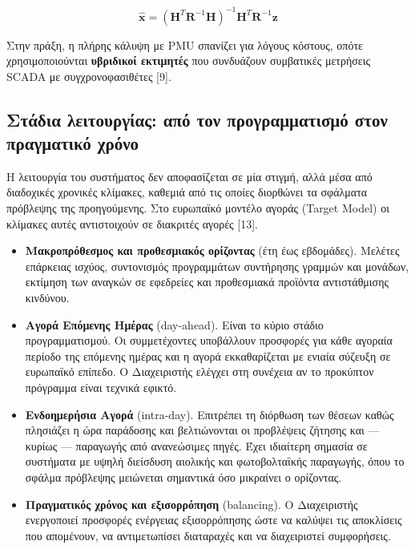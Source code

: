 \begin{equation}
\hat{\mathbf{x}} = \left(\mathbf{H}^{T}\mathbf{R}^{-1}\mathbf{H}\right)^{-1}
                    \mathbf{H}^{T}\mathbf{R}^{-1}\mathbf{z}
\label{eq:linse}
\end{equation}

Στην πράξη, η πλήρης κάλυψη με PMU σπανίζει για λόγους κόστους, οπότε χρησιμοποιούνται
\textbf{υβριδικοί εκτιμητές} που συνδυάζουν συμβατικές μετρήσεις SCADA με συγχρονοφασιθέτες [9].

\subsection{Στάδια λειτουργίας: από τον προγραμματισμό στον πραγματικό χρόνο}

Η λειτουργία του συστήματος δεν αποφασίζεται σε μία στιγμή, αλλά μέσα από διαδοχικές χρονικές
κλίμακες, καθεμιά από τις οποίες διορθώνει τα σφάλματα πρόβλεψης της προηγούμενης. Στο ευρωπαϊκό
μοντέλο αγοράς (Target Model) οι κλίμακες αυτές αντιστοιχούν σε διακριτές αγορές [13].

\begin{itemize}
\item \textbf{Μακροπρόθεσμος και προθεσμιακός ορίζοντας} (έτη έως εβδομάδες). Μελέτες επάρκειας
      ισχύος, συντονισμός προγραμμάτων συντήρησης γραμμών και μονάδων, εκτίμηση των αναγκών σε
      εφεδρείες και προθεσμιακά προϊόντα αντιστάθμισης κινδύνου.
\item \textbf{Αγορά Επόμενης Ημέρας} (day-ahead). Είναι το κύριο στάδιο προγραμματισμού. Οι
      συμμετέχοντες υποβάλλουν προσφορές για κάθε αγοραία περίοδο της επόμενης ημέρας και η αγορά
      εκκαθαρίζεται με ενιαία σύζευξη σε ευρωπαϊκό επίπεδο. Ο Διαχειριστής ελέγχει στη συνέχεια αν
      το προκύπτον πρόγραμμα είναι τεχνικά εφικτό.
\item \textbf{Ενδοημερήσια Αγορά} (intra-day). Επιτρέπει τη διόρθωση των θέσεων καθώς πλησιάζει η
      ώρα παράδοσης και βελτιώνονται οι προβλέψεις ζήτησης και — κυρίως — παραγωγής από ανανεώσιμες
      πηγές. Έχει ιδιαίτερη σημασία σε συστήματα με υψηλή διείσδυση αιολικής και φωτοβολταϊκής
      παραγωγής, όπου το σφάλμα πρόβλεψης μειώνεται σημαντικά όσο μικραίνει ο ορίζοντας.
\item \textbf{Πραγματικός χρόνος και εξισορρόπηση} (balancing). Ο Διαχειριστής ενεργοποιεί
      προσφορές ενέργειας εξισορρόπησης ώστε να καλύψει τις αποκλίσεις που απομένουν, να
      αντιμετωπίσει διαταραχές και να διαχειριστεί συμφορήσεις.
\end{itemize}

